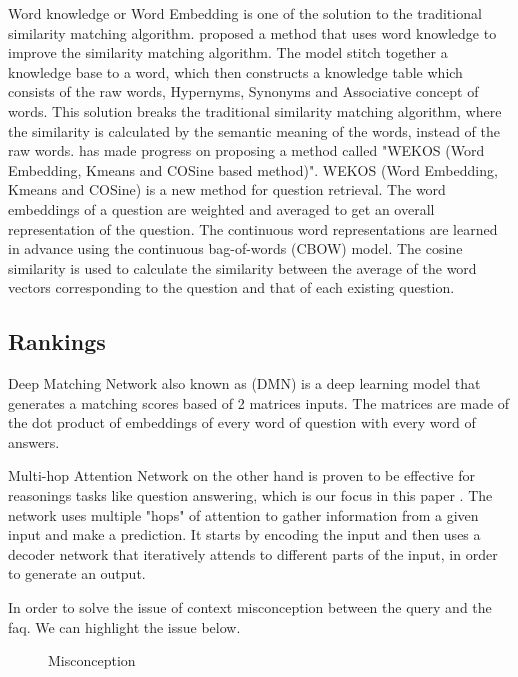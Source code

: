Word knowledge or Word Embedding is one of the solution to the traditional similarity matching algorithm. \cite{Improving_question_retrieval_in_community_question_answering_using_world_knowledge} proposed a method that uses word knowledge to improve the similarity matching algorithm. The model stitch together a knowledge base to a word, which then constructs a knowledge table which consists of the raw words, Hypernyms, Synonyms and Associative concept of words. This solution breaks the traditional similarity matching algorithm, where the similarity is calculated by the semantic meaning of the words, instead of the raw words. \cite{OTHMAN2019485} has made progress on proposing a method called "WEKOS (Word Embedding, Kmeans
and COSine based method)". WEKOS (Word Embedding, Kmeans and COSine) is a new method for question retrieval. The word embeddings of a question are weighted and averaged to get an overall representation of the question. The continuous word representations are learned in advance using the continuous bag-of-words (CBOW) model. \cite{OTHMAN2019485} The cosine similarity is used to calculate the similarity between the average of the word vectors corresponding to the question and that of each existing question.

\pagebreak
\subsection{Rankings}
Deep Matching Network also known as (DMN) is a deep learning model that generates a matching scores based of 2 matrices inputs. The matrices are made of the dot product of embeddings of every word of question with every word of answers.

Multi-hop Attention Network on the other hand is proven to be effective for reasonings tasks like question answering, which is our focus in this paper \cite{faq_gen_1}. The network uses multiple "hops" of attention to gather information from a given input and make a prediction. It starts by encoding the input and then uses a decoder network that iteratively attends to different parts of the input, in order to generate an output.

In order to solve the issue of context misconception between the query and the faq. We can highlight the issue below. 

\begin{figure}[H]
  \centering
  \noindent {}
\caption{Misconception}\label{misconception_1}
\end{figure}

